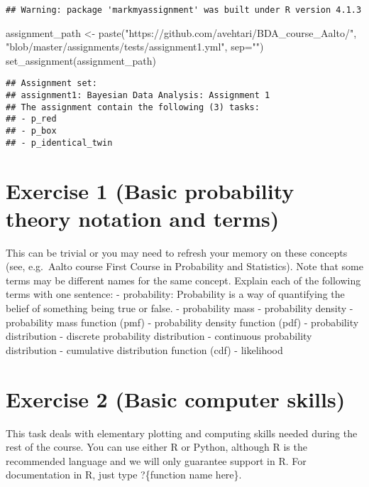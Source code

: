 \documentclass[
]{article}
\newenvironment{Shaded}{\begin{snugshade}}{\end{snugshade}}
\newcommand{\AttributeTok}[1]{\textcolor[rgb]{0.77,0.63,0.00}{#1}}
\newcommand{\FunctionTok}[1]{\textcolor[rgb]{0.00,0.00,0.00}{#1}}
\newcommand{\NormalTok}[1]{#1}
\newcommand{\OtherTok}[1]{\textcolor[rgb]{0.56,0.35,0.01}{#1}}
\newcommand{\StringTok}[1]{\textcolor[rgb]{0.31,0.60,0.02}{#1}}
\begin{document}
\begin{verbatim}
## Warning: package 'markmyassignment' was built under R version 4.1.3
\end{verbatim}

\begin{Shaded}
\begin{Highlighting}[]
\NormalTok{assignment\_path }\OtherTok{\textless{}{-}}
\FunctionTok{paste}\NormalTok{(}\StringTok{"https://github.com/avehtari/BDA\_course\_Aalto/"}\NormalTok{,}
\StringTok{"blob/master/assignments/tests/assignment1.yml"}\NormalTok{, }\AttributeTok{sep=}\StringTok{""}\NormalTok{)}
\FunctionTok{set\_assignment}\NormalTok{(assignment\_path)}
\end{Highlighting}
\end{Shaded}

\begin{verbatim}
## Assignment set:
## assignment1: Bayesian Data Analysis: Assignment 1
## The assignment contain the following (3) tasks:
## - p_red
## - p_box
## - p_identical_twin
\end{verbatim}

\hypertarget{exercise-1-basic-probability-theory-notation-and-terms}{%
\section{Exercise 1 (Basic probability theory notation and
terms)}\label{exercise-1-basic-probability-theory-notation-and-terms}}

This can be trivial or you may need to refresh your memory on these
concepts (see, e.g.~Aalto course First Course in Probability and
Statistics). Note that some terms may be different names for the same
concept. Explain each of the following terms with one sentence: -
probability: Probability is a way of quantifying the belief of something
being true or false. - probability mass - probability density -
probability mass function (pmf) - probability density function (pdf) -
probability distribution - discrete probability distribution -
continuous probability distribution - cumulative distribution function
(cdf) - likelihood

\hypertarget{exercise-2-basic-computer-skills}{%
\section{Exercise 2 (Basic computer
skills)}\label{exercise-2-basic-computer-skills}}

This task deals with elementary plotting and computing skills needed
during the rest of the course. You can use either R or Python, although
R is the recommended language and we will only guarantee support in R.
For documentation in R, just type ?\{function name here\}.
\end{document}
